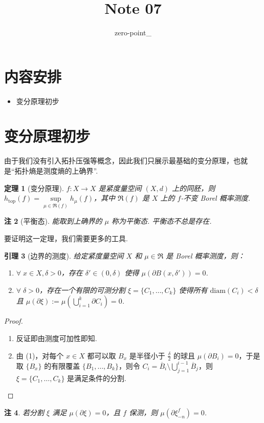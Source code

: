 \documentclass[11pt, a4paper, oneside]{ctexart}
\title{Note 07}
\author{zero-point\_}
\newtheorem{theorem}{定理}[section]
\newtheorem{lemma}[theorem]{引理}
\newtheorem{remark}[theorem]{注}
\newcommand{\fR}{\mathfrak{R}}
\newcommand{\diam}{\mathrm{diam}}
\renewcommand{\top}{\mathrm{top}}
\begin{document}
	\maketitle
    \section{内容安排}
    \begin{itemize}
        \item 变分原理初步
    \end{itemize}

    \section{变分原理初步}
    由于我们没有引入拓扑压强等概念，因此我们只展示最基础的变分原理，也就是“拓扑熵是测度熵的上确界”.

    \begin{theorem}[变分原理]\label{定理变分原理}
        $f:X\to X$ 是紧度量空间 $(X,d)$ 上的同胚，则 $h_{\top}(f)=\sup\limits_{\mu\in\fR(f)}h_{\mu}(f)$，其中 $\fR(f)$ 是 $X$ 上的 $f$-不变 Borel 概率测度.
    \end{theorem}
    \begin{remark}[平衡态]
        能取到上确界的 $\mu$ 称为平衡态. 平衡态不总是存在.
    \end{remark}
    
    要证明这一定理，我们需要更多的工具.
    \begin{lemma}[边界的测度]
        给定紧度量空间 $X$ 和 $\mu\in\fR$ 是 Borel 概率测度，则：
        \begin{enumerate}[(1)]
            \item $\forall\; x\in X,\delta>0$，存在 $\delta'\in (0,\delta)$ 使得 $\mu(\partial B(x,\delta'))=0$.
            \item $\forall\; \delta>0$，存在一个有限的可测分割 $\xi=\{C_1,\ldots,C_k\}$ 使得所有 $\diam(C_i)<\delta$ 且 $\mu(\partial\xi):=\mu(\bigcup\limits_{i=1}^{k}\partial C_i)=0$.
        \end{enumerate}
    \end{lemma}
    \begin{proof}
        \begin{enumerate}[(1)]
            \item 反证即由测度可加性即知.
            \item 由 (1)，对每个 $x\in X$ 都可以取 $B_x$ 是半径小于 $\frac{\delta}{2}$ 的球且 $\mu(\partial B_i)=0$，于是取 $\{B_x\}$ 的有限覆盖 $\{B_1,\ldots,B_k\}$，则令 $C_i=\overline{B}_i\setminus\bigcup\limits_{j=1}^{i-1}\overline{B}_j$，则 $\xi=\{C_1,\ldots,C_k\}$ 是满足条件的分割.
        \end{enumerate}
    \end{proof}
    \begin{remark}
        若分割 $\xi$ 满足 $\mu(\partial\xi)=0$，且 $f$ 保测，则 $\mu(\partial \xi_{-n}^f)=0$.
    \end{remark}
\end{document}
